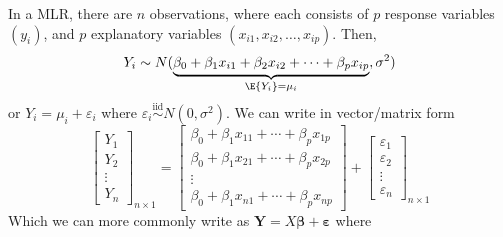 In a MLR, there are $ n $ observations, where each consists of
$ p $ response variables $ (y_i) $, and $ p $ explanatory variables $ (x_{i1},x_{i2},\ldots,x_{ip}) $.
Then,
\[ Y_i \sim N(
    \underbrace{\beta_0+\beta_1x_{i1}+
        \beta_2x_{i2}+\cdots +\beta_p x_{ip}}_{\E{Y_i}=
        \mu_i},\sigma^2) \]
or $ Y_i=\mu_i+\varepsilon_i $ where $ \varepsilon_i \stackrel{\text{iid}}{\sim}
    N(0,\sigma^2) $.
We can write in vector/matrix form
\[ \begin{bmatrix}
        Y_1    \\
        Y_2    \\
        \vdots \\
        Y_n
    \end{bmatrix}_{n\times 1}=
    \begin{bmatrix}
        \beta_0+\beta_1x_{11}+\cdots+\beta_p x_{1p} \\
        \beta_0+\beta_1x_{21}+\cdots+\beta_p x_{2p} \\
        \vdots                                      \\
        \beta_0+\beta_1x_{n1}+\cdots+\beta_p x_{np}
    \end{bmatrix}+
    \begin{bmatrix}
        \varepsilon_1 \\
        \varepsilon_2 \\
        \vdots        \\
        \varepsilon_n
    \end{bmatrix}_{n\times 1} \]
Which we can more commonly write as $ \symbf{Y}=X\symbf{\beta}+\symbf{\varepsilon} $ where
